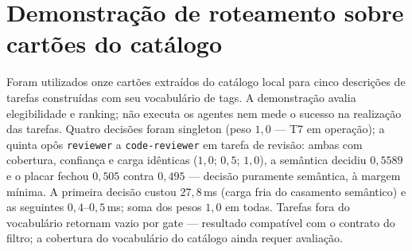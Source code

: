 \section{Demonstração de roteamento sobre cartões do catálogo}
Foram utilizados onze cartões extraídos do catálogo local para cinco descrições de tarefas construídas com seu vocabulário de tags. A demonstração avalia elegibilidade e ranking; não executa os agentes nem mede o sucesso na realização das tarefas. Quatro decisões foram singleton (peso $1{,}0$ --- T7 em operação); a quinta opôs \texttt{reviewer} a \texttt{code-reviewer} em tarefa de revisão: ambas com cobertura, confiança e carga idênticas ($1{,}0$; $0{,}5$; $1{,}0$), a semântica decidiu $0{,}5589$ e o placar fechou $0{,}505$ contra $0{,}495$ --- decisão puramente semântica, à margem mínima. A primeira decisão custou $27{,}8$\,ms (carga fria do casamento semântico) e as seguintes $0{,}4$--$0{,}5$\,ms; soma dos pesos $1{,}0$ em todas. Tarefas fora do vocabulário retornam vazio por gate --- resultado compatível com o contrato do filtro; a cobertura do vocabulário do catálogo ainda requer avaliação.
